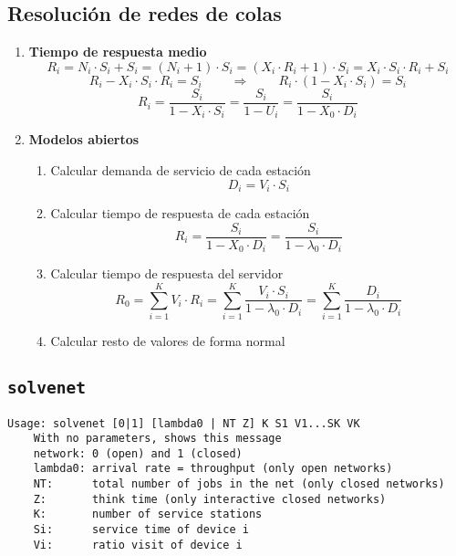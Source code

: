 \documentclass[10pt,spanish, landscape, twocolumn]{article}
\begin{document}
\subsection{Resolución de redes de colas}
\begin{enumerate}[$\bullet$]
    \item \textbf{Tiempo de respuesta medio}
    \begin{displaymath}
        R_i = N_i \cdot S_i + S_i = (N_i + 1) \cdot S_i = (X_i \cdot R_i + 1) \cdot S_i = X_i \cdot S_i \cdot R_i + S_i
    \end{displaymath}
    \begin{displaymath}
        R_i - X_i \cdot S_i \cdot R_i = S_i \qquad\ \Longrightarrow \qquad\ R_i \cdot (1 - X_i \cdot S_i) = S_i
    \end{displaymath}
    \begin{displaymath}
        R_i = \frac{S_i}{1 - X_i \cdot S_i} = \frac{S_i}{1 - U_i} = \frac{S_i}{1 - X_0 \cdot D_i}
    \end{displaymath}

    \item \textbf{Modelos abiertos}
    \begin{enumerate}[1.]
        \item Calcular demanda de servicio de cada estación
        \begin{displaymath}
            D_i = V_i \cdot S_i
        \end{displaymath}
        \item Calcular tiempo de respuesta de cada estación
        \begin{displaymath}
            R_i = \frac{S_i}{1 - X_0 \cdot D_i} = \frac{S_i}{1 - \lambda_0 \cdot D_i}
        \end{displaymath}
        \item Calcular tiempo de respuesta del servidor
        \begin{displaymath}
            R_0 = \sum_{i=1}^K V_i \cdot R_i = \sum_{i=1}^K \frac{V_i \cdot S_i}{1 - \lambda_0 \cdot D_i} = \sum_{i=1}^K \frac{D_i}{1 - \lambda_0 \cdot D_i}
        \end{displaymath}
        \item Calcular resto de valores de forma normal
    \end{enumerate}
\end{enumerate}

\newpage
\subsection{\texttt{solvenet}}
\begin{verbatim}
Usage: solvenet [0|1] [lambda0 | NT Z] K S1 V1...SK VK
    With no parameters, shows this message
    network: 0 (open) and 1 (closed)
    lambda0: arrival rate = throughput (only open networks)
    NT:      total number of jobs in the net (only closed networks)
    Z:       think time (only interactive closed networks)
    K:       number of service stations
    Si:      service time of device i
    Vi:      ratio visit of device i    
\end{verbatim}
\end{document}
